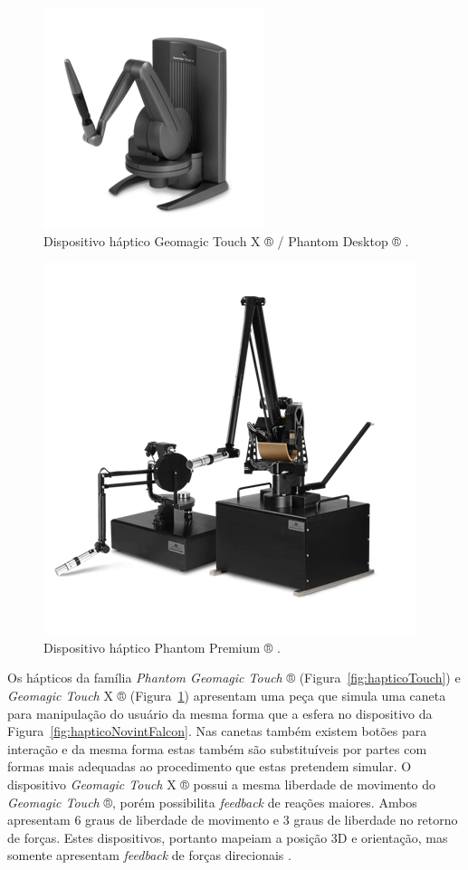 \begin{figure}[ht!]
    \centering
    \includegraphics[width=0.4\linewidth]{capitulos/figuras/hapticoTouchX.png}
    \caption{Dispositivo háptico Geomagic Touch X ® / Phantom Desktop ® \cite{3DSystems2018}.}
    \label{fig:hapticoTouchX}
\end{figure}


\begin{figure}[ht!]
    \centering
    \includegraphics[width=0.4\linewidth]{capitulos/figuras/hapticoPhantomPremium.png}
    \caption{Dispositivo háptico Phantom Premium ® \cite{3DSystems2018}.}
    \label{fig:hapticoPremium}
\end{figure}

Os hápticos da família \textit{Phantom Geomagic Touch} ® (Figura~\ref{fig:hapticoTouch}) e \textit{Geomagic Touch} X ® (Figura~\ref{fig:hapticoTouchX}) apresentam uma peça que simula uma caneta para manipulação do usuário da mesma forma que a esfera no dispositivo da Figura~\ref{fig:hapticoNovintFalcon}. Nas canetas também existem botões para interação e da mesma forma estas também são substituíveis por partes com formas mais adequadas ao procedimento que estas pretendem simular. O dispositivo \textit{Geomagic Touch} X ® possui a mesma liberdade de movimento do \textit{Geomagic Touch} ®, porém possibilita \textit{feedback} de reações maiores. Ambos apresentam 6 graus de liberdade de movimento e 3 graus de liberdade no retorno de forças. Estes dispositivos, portanto mapeiam a posição 3D e orientação, mas somente apresentam \textit{feedback} de forças direcionais \cite{Forsslund2013}.

